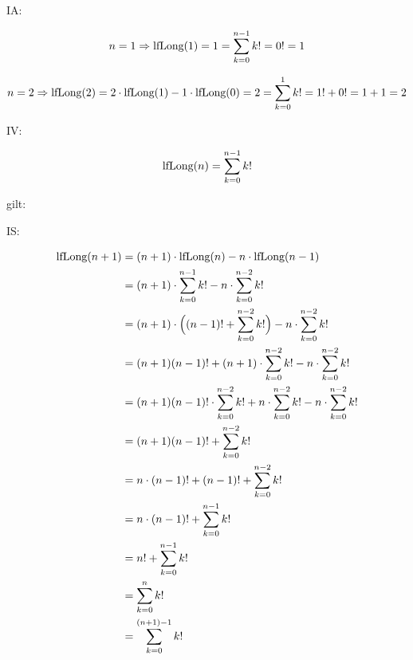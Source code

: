 \documentclass{lehramt-informatik-aufgabe}
\begin{document}
\begin{enumerate}
\begin{antwort}

IA:

\begin{displaymath}
n=1 \Rightarrow
\text{lfLong}(1) =
1 =
\sum^{n-1}_{k=0}k! =
0! =
1
\end{displaymath}

\begin{displaymath}
n=2 \Rightarrow
\text{lfLong}(2) =
2 \cdot \text{lfLong}(1) - 1 \cdot \text{lfLong}(0) =
2 =
\sum^{1}_{k=0}k! =
1! + 0! =
1 + 1 =
2
\end{displaymath}

IV:

\begin{displaymath}
\text{lfLong}(n) = \sum^{n-1}_{k=0}k!
\end{displaymath}

gilt:

IS:

\begin{equation}
\begin{split}
\text{lfLong}(n+1) & = (n+1) \cdot \text{lfLong}(n) - n \cdot \text{lfLong}(n-1) \\
& = (n+1) \cdot \sum^{n-1}_{k=0}k! - n \cdot \sum^{n-2}_{k=0}k! \\
& = (n+1) \cdot \Big((n-1)! + \sum^{n-2}_{k=0}k!\Big) - n \cdot \sum^{n-2}_{k=0}k! \\
& = (n+1)(n-1)! + (n+1) \cdot \sum^{n-2}_{k=0}k! - n \cdot \sum^{n-2}_{k=0}k! \\
& = (n+1)(n-1)! \cdot \sum^{n-2}_{k=0}k! + n \cdot \sum^{n-2}_{k=0}k! - n \cdot \sum^{n-2}_{k=0}k! \\
& = (n+1)(n-1)! + \sum^{n-2}_{k=0}k! \\
& = n \cdot (n-1)! + (n-1)! + \sum^{n-2}_{k=0}k! \\
& = n \cdot (n-1)! + \sum^{n-1}_{k=0}k! \\
& = n! + \sum^{n-1}_{k=0}k! \\
& = \sum^{n}_{k=0}k! \\
& = \sum^{(n+1)-1}_{k=0}k!
\end{split}
\end{equation}
\end{antwort}
\end{enumerate}
\end{document}
